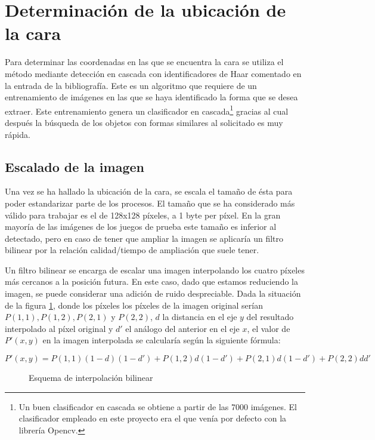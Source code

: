 \newpage

\section{Determinación de la ubicación de la cara}
Para determinar las coordenadas en las que se encuentra la cara se utiliza el método mediante detección en cascada con identificadores de Haar comentado en la entrada \cite{ViolaJones} de la bibliografía. Este es un algoritmo que requiere de un entrenamiento de imágenes en las que se haya identificado la forma que se desea extraer. Este entrenamiento genera un clasificador en cascada\footnote{Un buen clasificador en cascada se obtiene a partir de las 7000 imágenes. El clasificador empleado en este proyecto era el que venía por defecto con la librería Opencv.} gracias al cual después la búsqueda de los objetos con formas similares al solicitado es muy rápida. 



\subsection{Escalado de la imagen}
Una vez se ha hallado la ubicación de la cara, se escala el tamaño de ésta para poder estandarizar parte de los procesos. El tamaño que se ha considerado más válido para trabajar es el de 128x128 píxeles, a 1 byte per píxel. En la gran mayoría de las imágenes de los juegos de prueba este tamaño es inferior al detectado, pero en caso de tener que ampliar la imagen se aplicaría un filtro bilinear por la relación calidad/tiempo de ampliación que suele tener.

Un filtro bilinear se encarga de escalar una imagen interpolando los cuatro píxeles más cercanos a la posición futura. En este caso, dado que estamos reduciendo la imagen, se puede considerar una adición de ruido despreciable. Dada la situación de la figura \ref{fig:interp_bilinear}, donde los píxeles los píxeles de la imagen original serían $P(1,1), P(1,2), P(2,1)$ y $P(2,2)$, $d$ la distancia en el eje $y$ del resultado interpolado al píxel original y $d'$ el análogo del anterior en el eje $x$, el valor de $P'(x,y)$ en la imagen interpolada se calcularía según la siguiente fórmula:

\[ P'(x,y) = P(1,1) (1-d) (1-d')+ P(1,2) d (1-d') + P(2,1) d (1-d') + P(2,2) d d'
\]

\begin{figure}[h!]
        \centering
        
        \caption{Esquema de interpolación bilinear}
	\label{fig:interp_bilinear}
\end{figure}


